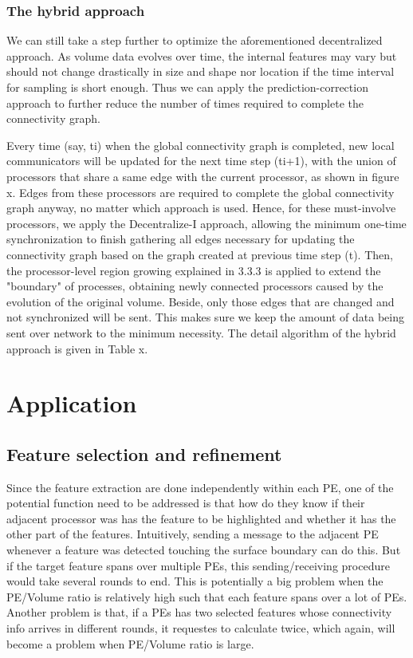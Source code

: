 \documentclass[10pt, conference, compsocconf]{IEEEtran}
\begin{document}
\subsubsection{The hybrid approach}
We can still take a step further to optimize the aforementioned decentralized approach. As volume data evolves over time, the internal features may vary but should not change drastically in size and shape nor location if the time interval for sampling is short enough. Thus we can apply the prediction-correction approach to further reduce the number of times required to complete the connectivity graph. 

Every time (say, ti) when the global connectivity graph is completed, new local communicators will be updated for the next time step (ti+1), with the union of processors that share a same edge with the current processor, as shown in figure x. Edges from these processors are required to complete the global connectivity graph anyway, no matter which approach is used. Hence, for these must-involve processors, we apply the Decentralize-I approach, allowing the minimum one-time synchronization to finish gathering all edges necessary for updating the connectivity graph based on the graph created at previous time step (t). Then, the processor-level region growing explained in 3.3.3 is applied to extend the "boundary" of processes, obtaining newly connected processors caused by the evolution of the original volume. Beside, only those edges that are changed and not synchronized will be sent. This makes sure we keep the amount of data being sent over network to the minimum necessity.
The detail algorithm of the hybrid approach is given in Table x.

\section{Application}

\subsection{Feature selection and refinement}
Since the feature extraction are done independently within each PE, one of the potential function need to be addressed is that how do they know if their adjacent processor was has the feature to be highlighted and whether it has the other part of the features. Intuitively, sending a message to the adjacent PE whenever a feature was detected touching the surface boundary can do this. But if the target feature spans over multiple PEs, this sending/receiving procedure would take several rounds to end. This is potentially a big problem when the PE/Volume ratio is relatively high such that each feature spans over a lot of PEs. Another problem is that, if a PEs has two selected features whose connectivity info arrives in different rounds, it requestes to calculate twice, which again, will become a problem when PE/Volume ratio is large.
\end{document}
